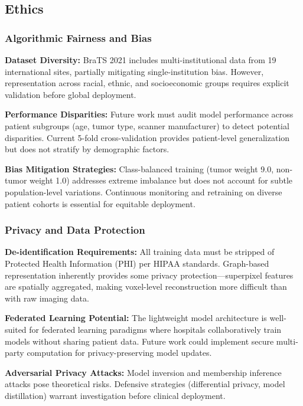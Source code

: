 \subsection{Ethics}

\subsubsection{Algorithmic Fairness and Bias}

\textbf{Dataset Diversity:} BraTS 2021 includes multi-institutional data from 19 international sites, partially mitigating single-institution bias. However, representation across racial, ethnic, and socioeconomic groups requires explicit validation before global deployment.

\textbf{Performance Disparities:} Future work must audit model performance across patient subgroups (age, tumor type, scanner manufacturer) to detect potential disparities. Current 5-fold cross-validation provides patient-level generalization but does not stratify by demographic factors.

\textbf{Bias Mitigation Strategies:} Class-balanced training (tumor weight 9.0, non-tumor weight 1.0) addresses extreme imbalance but does not account for subtle population-level variations. Continuous monitoring and retraining on diverse patient cohorts is essential for equitable deployment.

\subsubsection{Privacy and Data Protection}

\textbf{De-identification Requirements:} All training data must be stripped of Protected Health Information (PHI) per HIPAA standards. Graph-based representation inherently provides some privacy protection—superpixel features are spatially aggregated, making voxel-level reconstruction more difficult than with raw imaging data.

\textbf{Federated Learning Potential:} The lightweight model architecture is well-suited for federated learning paradigms where hospitals collaboratively train models without sharing patient data. Future work could implement secure multi-party computation for privacy-preserving model updates.

\textbf{Adversarial Privacy Attacks:} Model inversion and membership inference attacks pose theoretical risks. Defensive strategies (differential privacy, model distillation) warrant investigation before clinical deployment.

